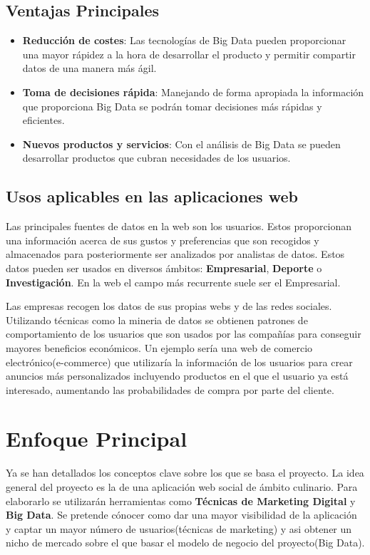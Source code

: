 \subsection{Ventajas Principales}


\begin{itemize}
  \item \textbf{Reducción de costes}: Las tecnologías de Big Data pueden proporcionar una mayor rápidez a la hora de desarrollar el producto y permitir compartir datos de una manera más ágil.
  
  \item \textbf{Toma de decisiones rápida}: Manejando de forma apropiada la información que proporciona Big Data se podrán tomar 
  decisiones más rápidas y eficientes.
  
  \item \textbf{Nuevos productos y servicios}: Con el análisis de Big Data se pueden desarrollar productos que cubran necesidades de los usuarios.
  
\end{itemize}

\subsection{Usos aplicables en las aplicaciones web}

Las principales fuentes de datos en la web son los usuarios. Estos proporcionan una información acerca de sus gustos y preferencias que son recogidos y almacenados para posteriormente ser analizados por analistas de datos. Estos datos pueden ser usados en diversos ámbitos: \textbf{Empresarial}, \textbf{Deporte} o \textbf{Investigación}. En la web el campo más recurrente suele ser el Empresarial.

\vspace{5 mm}

Las empresas recogen los datos de sus propias webs y de las redes sociales. Utilizando técnicas como la mineria de datos se obtienen patrones de comportamiento de los usuarios que son usados por las compañías para conseguir mayores beneficios económicos. Un ejemplo sería una web de comercio electrónico(e-commerce) que utilizaría la información de los usuarios para crear anuncios más personalizados incluyendo productos en el que el usuario ya está interesado, aumentando las probabilidades de compra por parte del cliente.


\section{Enfoque Principal}

Ya se han detallados los conceptos clave sobre los que se basa el proyecto. La idea general del proyecto es la de una aplicación web social de ámbito culinario. Para elaborarlo se utilizarán herramientas como \textbf{Técnicas de Marketing Digital} y \textbf{Big Data}. Se pretende cónocer como dar una mayor visibilidad de la aplicación y captar un mayor número de usuarios(técnicas de marketing) y asi obtener un nicho de mercado sobre el que basar el modelo de negocio del proyecto(Big Data).

